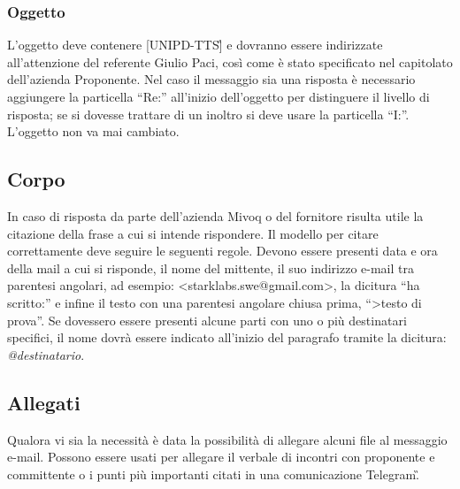 \subsubsection{Oggetto}
L'oggetto deve contenere [UNIPD-TTS\G] e dovranno essere indirizzate 
all'attenzione del referente Giulio Paci, così come è stato specificato nel 
capitolato dell'azienda Proponente. Nel caso il messaggio sia una risposta è 
necessario aggiungere la particella “Re:” all'inizio dell'oggetto per 
distinguere il livello di risposta; se si dovesse trattare di un inoltro si 
deve usare la particella “I:”. L'oggetto non va mai cambiato.

\subsection{Corpo}
In caso di risposta da parte dell'azienda Mivoq o del fornitore
risulta utile la citazione della frase a cui si intende rispondere. Il modello 
per citare correttamente deve seguire le seguenti regole. Devono essere 
presenti data e ora della mail a cui si risponde, il nome del mittente, il suo 
indirizzo e-mail tra parentesi angolari, ad esempio: <starklabs.swe@gmail.com>, 
la dicitura “ha scritto:” e infine il testo con una parentesi angolare chiusa 
prima, “>testo di prova”. Se dovessero essere presenti alcune parti con uno o 
più destinatari specifici, il nome dovrà essere indicato all'inizio del 
paragrafo tramite la dicitura: \textit{@destinatario}.

\subsection{Allegati}
Qualora vi sia la necessità è data la possibilità di allegare alcuni file al 
messaggio e-mail. Possono essere usati per allegare il verbale di incontri con 
proponente e committente o i punti più importanti citati in una comunicazione 
Telegram\G.
